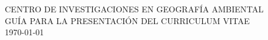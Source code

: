 \documentclass[12pt]{report}
\begin{document}
\begin{center}
 CENTRO DE INVESTIGACIONES EN GEOGRAFÍA AMBIENTAL \\
GUÍA PARA LA PRESENTACIÓN DEL CURRICULUM VITAE \\
\today \\
\end{center}

\renewcommand{\labelenumi}{%
 \textbf{\theenumi}. }

\renewcommand{\theenumii}{\arabic{enumii}}
\renewcommand{\labelenumii}{%
    \textbf{\theenumi}.\theenumii. }

\renewcommand{\theenumiii}{\arabic{enumiii}}
\renewcommand{\labelenumiii}{%
    \textbf{\theenumi}.\theenumii.\theenumiii.}

\renewcommand{\labelitemi}{\tiny$\blacksquare$}
\renewcommand{\labelitemii}{\tiny$\blacksquare$}
\renewcommand{\labelitemiii}{\tiny$\blacksquare$}
\end{document}
